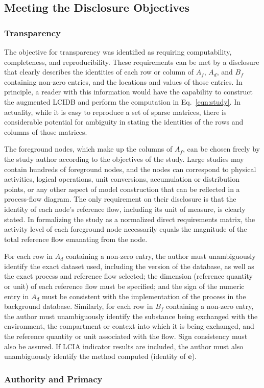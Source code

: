 


\subsection{Meeting the Disclosure Objectives}

\subsubsection{Transparency}

The objective for transparency was identified as requiring computability, completeness, and reproducibility.  These requirements can be met by a disclosure that clearly describes the identities of each row or column of $A_f$, $A_d$, and $B_f$ containing non-zero entries, and the locations and values of those entries.  In principle, a reader with this information would have the capability to construct the augmented LCIDB and perform the computation in Eq.~\ref{eqn:study}.  In actuality, while it is easy to reproduce a set of sparse matrices, there is considerable potential for ambiguity in stating the identities of the rows and columns of those matrices.

The foreground nodes, which make up the columns of $A_f$, can be chosen freely by the study author according to the objectives of the study.  Large studies may contain hundreds of foreground nodes, and the nodes can correspond to physical activities, logical operations, unit conversions, accumulation or distribution points, or any other aspect of model construction that can be reflected in a process-flow diagram.  The only requirement on their disclosure is that the identity of each node's reference flow, including its unit of measure, is clearly stated.  In formalizing the study as a normalized direct requirements matrix, the activity level of each foreground node necessarily equals the magnitude of the total reference flow emanating from the node.

For each row in $A_d$ containing a non-zero entry, the author must unambiguously identify the exact dataset used, including the version of the database, as well as the exact process and reference flow selected; the dimension (reference quantity or unit) of each reference flow must be specified; and the sign of the numeric entry in $A_d$ must be consistent with the implementation of the process in the background database.  Similarly, for each row in $B_f$ containing a non-zero entry, the author must unambiguously identify the substance being exchanged with the environment, the compartment or context into which it is being exchanged, and the reference quantity or unit associated with the flow.  Sign consistency must also be assured.  If LCIA indicator results are included, the author must also unambiguously identify the method computed (identity of $\mathbf{e}$).

\subsubsection{Authority and Primacy}

